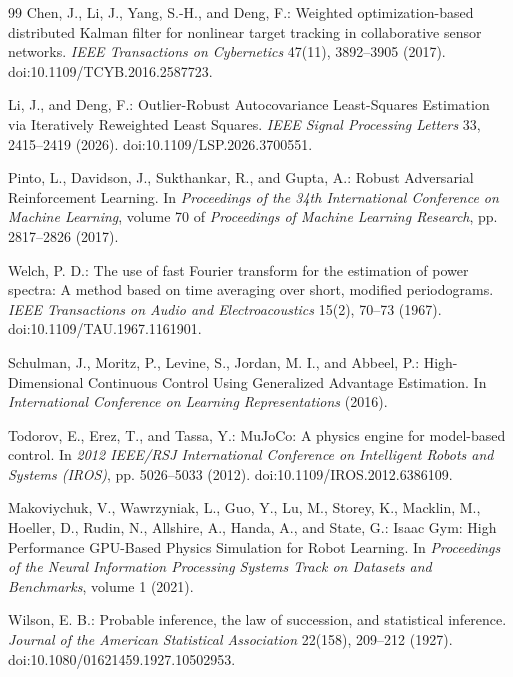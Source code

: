 \documentclass[twoside,final,1p,times]{elsarticle}
\begin{document}
\begin{thebibliography}{99}
Chen, J., Li, J., Yang, S.-H., and Deng, F.: Weighted optimization-based distributed Kalman filter for nonlinear target tracking in collaborative sensor networks.
\emph{IEEE Transactions on Cybernetics} 47(11), 3892--3905 (2017). doi:10.1109/TCYB.2016.2587723.

Li, J., and Deng, F.: Outlier-Robust Autocovariance Least-Squares Estimation via Iteratively Reweighted Least Squares.
\emph{IEEE Signal Processing Letters} 33, 2415--2419 (2026). doi:10.1109/LSP.2026.3700551.

Pinto, L., Davidson, J., Sukthankar, R., and Gupta, A.: Robust Adversarial Reinforcement Learning.
In \emph{Proceedings of the 34th International Conference on Machine Learning}, volume 70 of \emph{Proceedings of Machine Learning Research}, pp. 2817--2826 (2017).

Welch, P. D.: The use of fast Fourier transform for the estimation of power spectra: A method based on time averaging over short, modified periodograms.
\emph{IEEE Transactions on Audio and Electroacoustics} 15(2), 70--73 (1967). doi:10.1109/TAU.1967.1161901.

Schulman, J., Moritz, P., Levine, S., Jordan, M. I., and Abbeel, P.: High-Dimensional Continuous Control Using Generalized Advantage Estimation.
In \emph{International Conference on Learning Representations} (2016).

Todorov, E., Erez, T., and Tassa, Y.: MuJoCo: A physics engine for model-based control.
In \emph{2012 IEEE/RSJ International Conference on Intelligent Robots and Systems (IROS)}, pp. 5026--5033 (2012). doi:10.1109/IROS.2012.6386109.

Makoviychuk, V., Wawrzyniak, L., Guo, Y., Lu, M., Storey, K., Macklin, M., Hoeller, D., Rudin, N., Allshire, A., Handa, A., and State, G.: Isaac Gym: High Performance GPU-Based Physics Simulation for Robot Learning.
In \emph{Proceedings of the Neural Information Processing Systems Track on Datasets and Benchmarks}, volume 1 (2021).

Wilson, E. B.: Probable inference, the law of succession, and statistical inference.
\emph{Journal of the American Statistical Association} 22(158), 209--212 (1927). doi:10.1080/01621459.1927.10502953.
\end{thebibliography}
\end{document}
